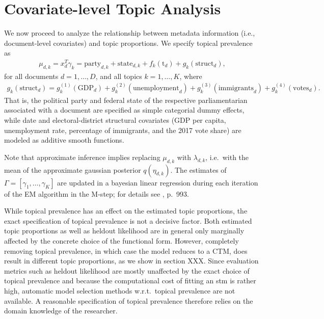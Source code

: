 \section{Covariate-level Topic Analysis}

We now proceed to analyze the relationship between metadata information (i.e., document-level covariates) and topic proportions. We specify topical prevalence as 
\begin{align}
\mu_{d,k} = x_d^T \gamma_k= \text{party}_{d,k} + \text{state}_{d,k} + f_k(\text{t}_d) + g_k(\text{struct}_d), \label{prevalence}
\end{align} 
for all documents $d = 1,\dots,D$, and all topics $k = 1,\dots,K$, where 
\begin{align*}
g_k(\text{struct}_d) = g_{k}^{(1)}(\text{GDP}_d)+g_{k}^{(2)}(\text{unemployment}_d)+g_{k}^{(3)}(\text{immigrants}_d)+g_{k}^{(4)}(\text{votes}_d). 
\end{align*} 
That is, the political party and federal state of the respective parliamentarian associated with a document are specified as simple categorial dummy effects, while date and electoral-district structural covariates (GDP per capita, unemployment rate, percentage of immigrants, and the 2017 vote share) are modeled as additive smooth functions.

Note that approximate inference implies replacing $\mu_{d,k}$ with $\lambda_{d,k}$, i.e.\ with the mean of the approximate gaussian posterior $q(\eta_{d,k})$. The estimates of $\Gamma = [\gamma_1, \dots, \gamma_K]$ are updated in a bayesian linear regression during each iteration of the EM algorithm in the M-step; for details see \cite{roberts2013structural}, p.\ 993.

While topical prevalence has an effect on the estimated topic proportions, the exact specification of topical prevalence is not a decisive factor. Both estimated topic proportions as well as heldout likelihood are in general only marginally affected by the concrete choice of the functional form. However, completely removing topical prevalence, in which case the model reduces to a CTM, does result in different topic proportions, as we show in section XXX. Since evaluation metrics such as heldout likelihood are mostly unaffected by the exact choice of topical prevalence and because the computational cost of fitting an stm is rather high, automatic model selection methods w.r.t.\ topical prevalence are not available. A reasonable specification of topical prevalence therefore relies on the domain knowledge of the researcher.

